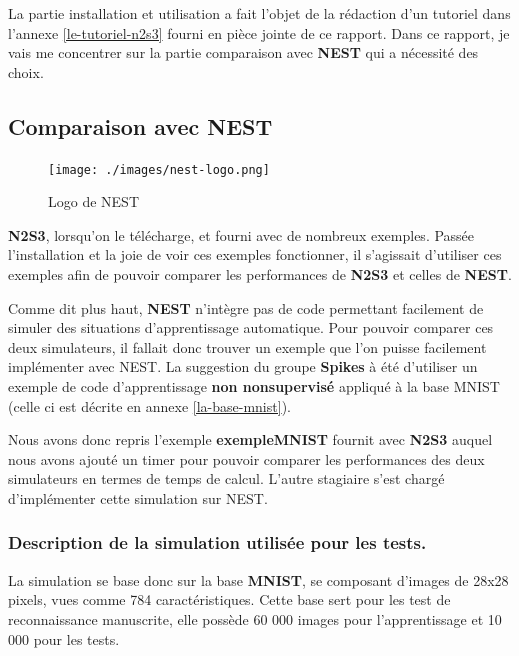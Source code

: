 La partie installation et utilisation a fait l'objet de la rédaction
d'un tutoriel dans l'annexe \ref{le-tutoriel-n2s3} fourni en pièce
jointe de ce rapport. Dans ce rapport, je vais me concentrer sur la
partie comparaison avec \textbf{NEST} qui a nécessité des choix.

\hypertarget{comparaison-avec-nest}{%
\subsection{Comparaison avec NEST}\label{comparaison-avec-nest}}

\begin{figure}[h!]
\label{fig:nest-logo}
\centering
\texttt{[image: ./images/nest-logo.png]}
\caption{Logo de NEST}
\end{figure}

\textbf{N2S3}, lorsqu'on le télécharge, et fourni avec de nombreux
exemples. Passée l'installation et la joie de voir ces exemples
fonctionner, il s'agissait d'utiliser ces exemples afin de pouvoir
comparer les performances de \textbf{N2S3} et celles de \textbf{NEST}.

Comme dit plus haut, \textbf{NEST} n'intègre pas de code permettant
facilement de simuler des situations d'apprentissage automatique. Pour
pouvoir comparer ces deux simulateurs, il fallait donc trouver un
exemple que l'on puisse facilement implémenter avec NEST. La suggestion
du groupe \textbf{Spikes} à été d'utiliser un exemple de code
d'apprentissage \textbf{non nonsupervisé} appliqué à la base MNIST
(celle ci est décrite en annexe \ref{la-base-mnist}).

Nous avons donc repris l'exemple \textbf{exempleMNIST} fournit avec
\textbf{N2S3} auquel nous avons ajouté un timer pour pouvoir comparer
les performances des deux simulateurs en termes de temps de calcul.
L'autre stagiaire s'est chargé d'implémenter cette simulation sur NEST.

\hypertarget{description-de-la-simulation-utilisuxe9e-pour-les-tests.}{%
\subsubsection{Description de la simulation utilisée pour les
tests.}\label{description-de-la-simulation-utilisuxe9e-pour-les-tests.}}

La simulation se base donc sur la base \textbf{MNIST}, se composant
d'images de 28x28 pixels, vues comme 784 caractéristiques. Cette base
sert pour les test de reconnaissance manuscrite, elle possède 60 000
images pour l'apprentissage et 10 000 pour les tests.

